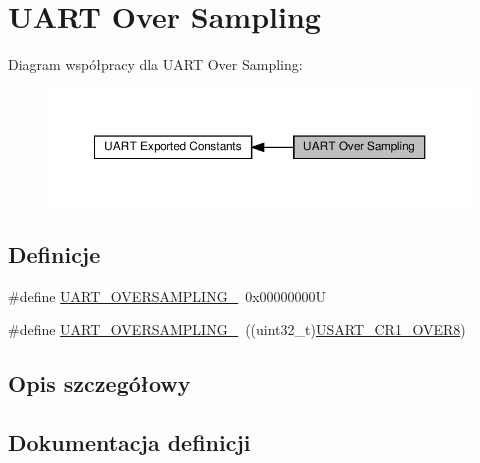 \hypertarget{group___u_a_r_t___over___sampling}{}\section{U\+A\+RT Over Sampling}
\label{group___u_a_r_t___over___sampling}
Diagram współpracy dla U\+A\+RT Over Sampling\+:\nopagebreak
\begin{figure}[H]
\begin{center}
\leavevmode
\includegraphics[width=350pt]{group___u_a_r_t___over___sampling}
\end{center}
\end{figure}
\subsection*{Definicje}
\begin{DoxyCompactItemize}
\item 
\#define \hyperlink{group___u_a_r_t___over___sampling_gaa6a320ec65d248d76f21de818db1a2f0}{U\+A\+R\+T\+\_\+\+O\+V\+E\+R\+S\+A\+M\+P\+L\+I\+N\+G\+\_}~0x00000000U
\item 
\#define \hyperlink{group___u_a_r_t___over___sampling_gaeb13896e8bdc1bb041e01a86a868ee0b}{U\+A\+R\+T\+\_\+\+O\+V\+E\+R\+S\+A\+M\+P\+L\+I\+N\+G\+\_}~((uint32\+\_\+t)\hyperlink{group___peripheral___registers___bits___definition_gaed6caeb0cb48f1a7b34090f31a92a8e2}{U\+S\+A\+R\+T\+\_\+\+C\+R1\+\_\+\+O\+V\+E\+R8})
\end{DoxyCompactItemize}


\subsection{Opis szczegółowy}


\subsection{Dokumentacja definicji}
\mbox{\label{group___u_a_r_t___over___sampling_gaa6a320ec65d248d76f21de818db1a2f0}} 
